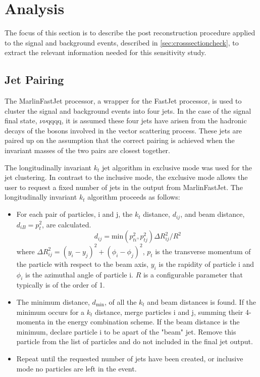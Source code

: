 \section{Analysis}
\label{sec:analysis}
The focus of this section is to describe the post reconstruction procedure applied to the signal and background events, described in \ref{sec:crosssectioncheck}, to extract the relevant information needed for this sensitivity study. 

\subsection{Jet Pairing} 
\label{sec:jetpairing}
The MarlinFastJet processor, a wrapper for the FastJet \cite{Cacciari:2011ma} processor, is used to cluster the signal and background events into four jets.  In the case of the signal final state, $\nu\nu$qqqq, it is assumed these four jets have arisen from the hadronic decays of the bosons involved in the vector scattering process.  These jets are paired up on the assumption that the correct pairing is achieved when the invariant masses of the two pairs are closest together. 

The longitudinally invariant $k_{t}$ jet algorithm in exclusive mode was used for the jet clustering.  In contrast to the inclusive mode, the exclusive mode allows the user to request a fixed number of jets in the output from MarlinFastJet.  The longitudinally invariant $k_{t}$ algorithm proceeds as follows:
\begin{itemize}
\item For each pair of particles, i and j, the $k_{t}$ distance, $d_{ij}$, and beam distance, $d_{iB} = p_{t}^{2}$, are calculated.
\begin{equation}
d_{ij} = \text{min}(p_{ti}^{2}, p_{tj}^{2}){\Delta}R^{2}_{ij}/R^{2}
\end{equation}
where ${\Delta}R^{2}_{ij} = (y_{i} - y_{j})^2 + (\phi_{i} - \phi_{j})^2$, $p_{t}$ is the transverse momentum of the particle with respect to the beam axis, $y_{i}$ is the rapidity of particle i and $\phi_{i}$ is the azimuthal angle of particle i. $R$ is a configurable parameter that typically is of the order of 1.
\item The minimum distance, $d_\text{min}$, of all the $k_{t}$ and beam distances is found.  If the minimum occurs for a $k_{t}$ distance, merge particles i and j, summing their 4-momenta in the energy combination scheme.  If the beam distance is the minimum, declare particle i to be apart of the "beam" jet.  Remove this particle from the list of particles and do not included in the final jet output.
\item Repeat until the requested number of jets have been created, or inclusive mode no particles are left in the event.
\end{itemize}

